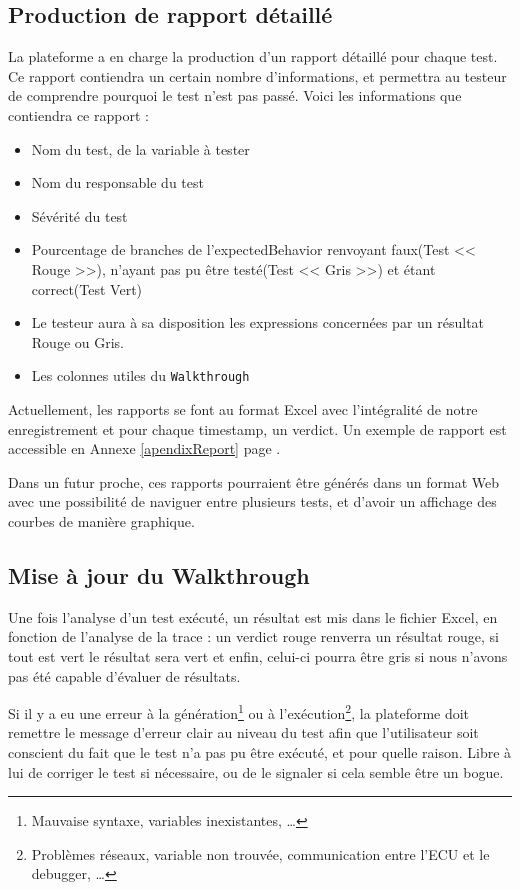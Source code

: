 \subsection{Production de rapport détaillé}\label{report}
La plateforme a en charge la production d'un rapport détaillé pour chaque test. Ce rapport contiendra un certain nombre d'informations, et permettra au testeur de comprendre pourquoi le test n'est pas passé. Voici les informations que contiendra ce rapport : 

\begin{itemize}
	\item Nom du test, de la variable à tester
	\item Nom du responsable du test
	\item Sévérité du test
	\item Pourcentage de branches de l'expectedBehavior renvoyant faux(Test << Rouge >>), n'ayant pas pu être testé(Test << Gris >>) et étant correct(Test Vert)
	\item Le testeur aura à sa disposition les expressions concernées par un résultat Rouge ou Gris.
	\item Les colonnes utiles du \texttt{Walkthrough}
\end{itemize}

Actuellement, les rapports se font au format Excel avec l'intégralité de notre enregistrement et pour chaque timestamp, un verdict. Un
exemple de rapport est accessible en Annexe \ref{apendixReport} page \pageref{apendixReport}. 

Dans un futur proche, ces rapports pourraient être générés dans un format Web avec une possibilité de naviguer entre plusieurs tests, et
d'avoir un affichage des courbes de manière graphique.

\subsection{Mise à jour du Walkthrough}
Une fois l'analyse d'un test exécuté, un résultat est mis dans le fichier Excel, en fonction de l'analyse de la trace : un verdict rouge renverra un résultat rouge, si tout est vert le résultat sera vert et enfin, celui-ci pourra être gris si nous n'avons pas été capable d'évaluer de résultats.

\begin{remarque}
	Si il y a eu une erreur à la génération\footnote{Mauvaise syntaxe, variables inexistantes, \ldots} ou à l'exécution\footnote{Problèmes réseaux, variable non trouvée, communication entre l'ECU et le debugger, \ldots}, la plateforme doit remettre le message d'erreur clair au niveau du test afin que l'utilisateur soit conscient du fait que le test n'a pas pu être exécuté, et pour quelle raison. Libre à lui de corriger le test si nécessaire, ou de le signaler si cela semble être un bogue.
\end{remarque}


